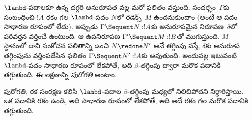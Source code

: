 \documentclass[../../../include/open-logic-section]{subfiles}
\begin{document}
 $\lambd$-పదాలకూ ఉన్న దగ్గరి అనురూపత వల్ల మరో ఫలితం వస్తుంది. సందర్భం~$\Gamma$కు సంబంధించి $!A$ రకం గల $\lambd$-పదం $N$లో రెడెక్స్~$M$ ఉందనుకుందాం (అంటే ఆ పదం సాధారణ రూపంలో లేదు). అప్పుడు $\Gamma \Sequent N : !A$కు అనురూపమైన  నిరూపణ~$\delta$లో పరివర్తన వర్తించే  ఉంటుంది. ఆ ఉపనిరూపణ $\Gamma'
\Sequent M: !B$తో ముగుస్తుంది. $M$ స్థానంలో దాని సంకోచన ఫలితాన్ని ఉంచి $N \redone
N'$ అనే తగ్గింపు వస్తే, $\delta$కు అనురూప తగ్గింపును వర్తింపజేసిన ఫలితం $\Gamma \Sequent
N' : !A$కు  అవుతుంది. అందువల్ల ఇటువంటి $\lambd$-పదం సాధారణ రూపంలో లేకపోతే, అది $\beta$-తగ్గింపు ద్వారా మరొక పదానికి తగ్గుతుంది. ఈ లక్షణాన్ని \emph{పురోగతి} అంటాం.

పురోగతి, రక సంరక్షణ కలిసి $\lambd$-పదాల $\beta$-తగ్గింపు మధ్యలో నిలిచిపోదని నిర్ధారిస్తాయి. ఒక పదానికి రకం ఉండి, అది సాధారణ రూపంలో లేకపోతే, అది అదే రకం గల మరొక పదానికి తగ్గుతుంది.
\end{document}
